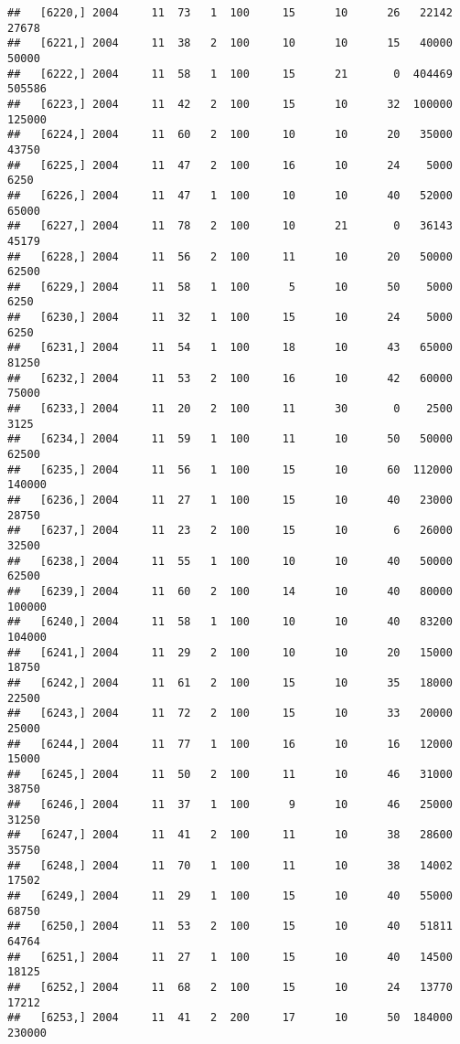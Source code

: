 \documentclass{article}\usepackage[]{graphicx}\usepackage[]{color}
\makeatletter
\newenvironment{kframe}{%
 \def\at@end@of@kframe{}%
 \ifinner\ifhmode%
  \def\at@end@of@kframe{\end{minipage}}%
  \begin{minipage}{\columnwidth}%
 \fi\fi%
 \def\FrameCommand##1{\hskip\@totalleftmargin \hskip-\fboxsep
 \colorbox{shadecolor}{##1}\hskip-\fboxsep
     \hskip-\linewidth \hskip-\@totalleftmargin \hskip\columnwidth}%
 \MakeFramed {\advance\hsize-\width
   \@totalleftmargin\z@ \linewidth\hsize
   \@setminipage}}%
 {\par\unskip\endMakeFramed%
 \at@end@of@kframe}
\newenvironment{knitrout}{}{} %
\makeatother
\begin{document}
\begin{knitrout}
\begin{kframe}
\begin{verbatim}
##   [6220,] 2004     11  73   1  100     15      10      26   22142   27678
##   [6221,] 2004     11  38   2  100     10      10      15   40000   50000
##   [6222,] 2004     11  58   1  100     15      21       0  404469  505586
##   [6223,] 2004     11  42   2  100     15      10      32  100000  125000
##   [6224,] 2004     11  60   2  100     10      10      20   35000   43750
##   [6225,] 2004     11  47   2  100     16      10      24    5000    6250
##   [6226,] 2004     11  47   1  100     10      10      40   52000   65000
##   [6227,] 2004     11  78   2  100     10      21       0   36143   45179
##   [6228,] 2004     11  56   2  100     11      10      20   50000   62500
##   [6229,] 2004     11  58   1  100      5      10      50    5000    6250
##   [6230,] 2004     11  32   1  100     15      10      24    5000    6250
##   [6231,] 2004     11  54   1  100     18      10      43   65000   81250
##   [6232,] 2004     11  53   2  100     16      10      42   60000   75000
##   [6233,] 2004     11  20   2  100     11      30       0    2500    3125
##   [6234,] 2004     11  59   1  100     11      10      50   50000   62500
##   [6235,] 2004     11  56   1  100     15      10      60  112000  140000
##   [6236,] 2004     11  27   1  100     15      10      40   23000   28750
##   [6237,] 2004     11  23   2  100     15      10       6   26000   32500
##   [6238,] 2004     11  55   1  100     10      10      40   50000   62500
##   [6239,] 2004     11  60   2  100     14      10      40   80000  100000
##   [6240,] 2004     11  58   1  100     10      10      40   83200  104000
##   [6241,] 2004     11  29   2  100     10      10      20   15000   18750
##   [6242,] 2004     11  61   2  100     15      10      35   18000   22500
##   [6243,] 2004     11  72   2  100     15      10      33   20000   25000
##   [6244,] 2004     11  77   1  100     16      10      16   12000   15000
##   [6245,] 2004     11  50   2  100     11      10      46   31000   38750
##   [6246,] 2004     11  37   1  100      9      10      46   25000   31250
##   [6247,] 2004     11  41   2  100     11      10      38   28600   35750
##   [6248,] 2004     11  70   1  100     11      10      38   14002   17502
##   [6249,] 2004     11  29   1  100     15      10      40   55000   68750
##   [6250,] 2004     11  53   2  100     15      10      40   51811   64764
##   [6251,] 2004     11  27   1  100     15      10      40   14500   18125
##   [6252,] 2004     11  68   2  100     15      10      24   13770   17212
##   [6253,] 2004     11  41   2  200     17      10      50  184000  230000

\end{verbatim}
\end{kframe}
\end{knitrout}
\end{document}
